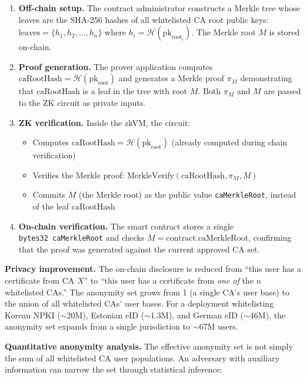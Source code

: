 \documentclass[11pt, a4paper]{article}
\providecommand{\tightlist}{%
  \setlength{\itemsep}{0pt}\setlength{\parskip}{0pt}}
\begin{document}
\begin{enumerate}
\def\labelenumi{\arabic{enumi}.}
\item
  \textbf{Off-chain setup.} The contract administrator constructs a
  Merkle tree whose leaves are the SHA-256 hashes of all whitelisted CA
  root public keys: \(\text{leaves} = \{h_1, h_2, \ldots, h_n\}\) where
  \(h_i = \mathcal{H}(\text{pk}_{\text{root}_i})\). The Merkle root
  \(M\) is stored on-chain.
\item
  \textbf{Proof generation.} The prover application computes
  \(\text{caRootHash} = \mathcal{H}(\text{pk}_{\text{root}})\) and
  generates a Merkle proof \(\pi_M\) demonstrating that
  \(\text{caRootHash}\) is a leaf in the tree with root \(M\). Both
  \(\pi_M\) and \(M\) are passed to the ZK circuit as private inputs.
\item
  \textbf{ZK verification.} Inside the zkVM, the circuit:

  \begin{itemize}
  \tightlist
  \item
    Computes
    \(\text{caRootHash} = \mathcal{H}(\text{pk}_{\text{root}})\)
    (already computed during chain verification)
  \item
    Verifies the Merkle proof:
    \(\text{MerkleVerify}(\text{caRootHash}, \pi_M, M)\)
  \item
    Commits \(M\) (the Merkle root) as the public value
    \texttt{caMerkleRoot}, instead of the leaf \(\text{caRootHash}\)
  \end{itemize}
\item
  \textbf{On-chain verification.} The smart contract stores a single
  \texttt{bytes32\ caMerkleRoot} and checks
  \(M = \text{contract.caMerkleRoot}\), confirming that the proof was
  generated against the current approved CA set.
\end{enumerate}

\textbf{Privacy improvement.} The on-chain disclosure is reduced from
``this user has a certificate from CA \(X\)'' to ``this user has a
certificate from \emph{one of} the \(n\) whitelisted CAs.'' The
anonymity set grows from 1 (a single CA's user base) to the union of all
whitelisted CAs' user bases. For a deployment whitelisting Korean NPKI
($\sim$20M), Estonian eID ($\sim$1.3M), and German eID
($\sim$46M), the anonymity set expands from a single
jurisdiction to $\sim$67M users.

\textbf{Quantitative anonymity analysis.} The effective anonymity set is
not simply the sum of all whitelisted CA user populations. An adversary
with auxiliary information can narrow the set through statistical
inference:
\end{document}
